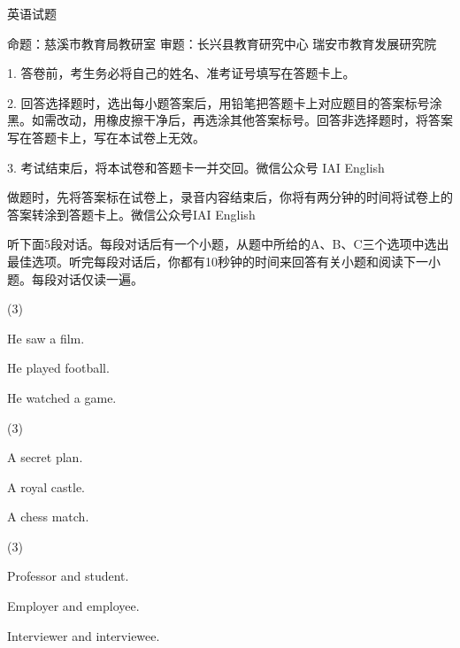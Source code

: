 \documentclass{英语试卷}
\begin{document}
\par 英语试题\par
\par 命题：慈溪市教育局教研室 审题：长兴县教育研究中心 瑞安市教育发展研究院\par
\begin{notice}
\par 1. 答卷前，考生务必将自己的姓名、准考证号填写在答题卡上。\par
\par 2. 回答选择题时，选出每小题答案后，用铅笔把答题卡上对应题目的答案标号涂黑。如需改动，用橡皮擦干净后，再选涂其他答案标号。回答非选择题时，将答案写在答题卡上，写在本试卷上无效。\par
\par 3. 考试结束后，将本试卷和答题卡一并交回。微信公众号 IAI English\par
\end{notice}
\par 做题时，先将答案标在试卷上，录音内容结束后，你将有两分钟的时间将试卷上的答案转涂到答题卡上。微信公众号IAI English\par
{}
\par 听下面5段对话。每段对话后有一个小题，从题中所给的A、B、C三个选项中选出最佳选项。听完每段对话后，你都有10秒钟的时间来回答有关小题和阅读下一小题。每段对话仅读一遍。\par
{}
\begin{choices}(3)
  \item He saw a film.
  \item He played football.
  \item He watched a game.
\end{choices}
\begin{choices}(3)
  \item A secret plan.
  \item A royal castle.
  \item A chess match.
\end{choices}
\begin{choices}(3)
  \item Professor and student.
  \item Employer and employee.
  \item Interviewer and interviewee.
\end{choices}
\end{document}
